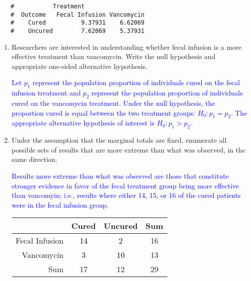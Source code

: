 \documentclass[letterpaper,12pt,twoside,]{pinp}
\begin{document}
\begin{enumerate}
\begin{Shaded}
\begin{Highlighting}[]
\OperatorTok{$}
\end{Highlighting}
\end{Shaded}

  \begin{ShadedResult}
   \begin{verbatim}
   #           Treatment
   #  Outcome   Fecal Infusion Vancomycin
   #    Cured          9.37931    6.62069
   #    Uncured        7.62069    5.37931
   \end{verbatim}
   \end{ShadedResult}

  \begin{enumerate}
  \def\labelenumii{\alph{enumii})}
  \setcounter{enumii}{1}
  \item
    Researchers are interested in understanding whether fecal infusion
    is a more effective treatment than vancomycin. Write the null
    hypothesis and appropriate one-sided alternative hypothesis.

    \textcolor{blue}{Let $p_1$ represent the population proportion of individuals cured on the fecal infusion treatment and $p_2$ represent the population proportion of individuals cured on the vancomycin treatment. Under the null hypothesis, the proportion cured is equal between the two treatment groups: $H_0: p_1 = p_2$. The appropriate alternative hypothesis of interest is $H_0: p_1 > p_2$. }
  \item
    Under the assumption that the marginal totals are fixed, enumerate
    all possible sets of results that are more extreme than what was
    observed, in the same direction.

    \textcolor{blue}{Results more extreme than what was observed are those that constitute stronger evidence in favor of the fecal treatment group being more effective than vancomyin; i.e., results where either 14, 15, or 16 of the cured patients were in the fecal infusion group.}

    \color{blue}

    \begin{table}[h]
     \centering
     \color{gray}
     \begin{tabular}{r|cc|c}
     \hline
     & Cured & Uncured & Sum \\ 
     \hline
     Fecal Infusion & \textcolor{black}{14} & \textcolor{black}{2} & 16 \\ 
     Vancomycin & \textcolor{black}{3} & \textcolor{black}{10} & 13 \\ 
     \hline
     Sum & 17 & 12 & 29 \\ 
     \hline
     \end{tabular}
     \end{table}


\end{enumerate}
\end{enumerate}
\end{document}
